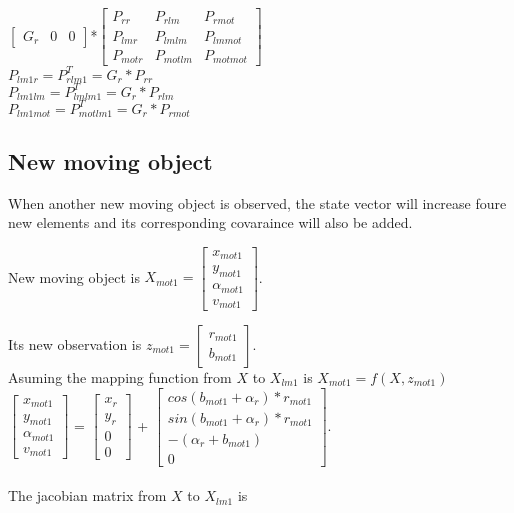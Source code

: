 \documentclass[11pt,a4paper]{article}
\begin{document}
										    $  \begin{bmatrix} G_{r} & 0 & 0 \end{bmatrix}$*$\begin{bmatrix} P_{rr} & P_{rlm} & P_{rmot}\\
										   P_{lmr}& P_{lmlm}  & P_{lmmot}\\
										   P_{motr}& P_{motlm}  & P_{motmot}\end{bmatrix}$\\
\noindent $P_{lm1r} = P_{rlm1}^{T} = G_{r}*P_{rr}$
\\										   									   
\noindent $P_{lm1lm} = P_{lmlm1}^{T} = G_{r}*P_{rlm}$
\\
\noindent $P_{lm1mot} = P_{motlm1}^{T} = G_{r}*P_{rmot}$

\subsection{New moving object}
When another new moving object is observed, the state vector will increase foure new elements and its corresponding covaraince will also be added.

\noindent New moving object is $ X_{mot1} =  \begin{bmatrix} x_{mot1} \\ y_{mot1} \\ \alpha_{mot1} \\ v_{mot1} \end{bmatrix} $.

\noindent Its new observation is $z_{mot1} = \begin{bmatrix} r_{mot1} \\ b_{mot1} \end{bmatrix}$.
\\
Asuming the mapping function from $X$ to $X_{lm1}$ is $X_{mot1} = f(X,z_{mot1})$
\\
\noindent $\begin{bmatrix} x_{mot1} \\ y_{mot1} \\ \alpha_{mot1} \\ v_{mot1} \end{bmatrix}$ = $\begin{bmatrix} x_{r} \\ y_{r} \\ 0 \\ 0 \end{bmatrix}$  +  $\begin{bmatrix}  cos(b_{mot1}+\alpha_{r})*r_{mot1}\\ sin(b_{mot1}+\alpha_{r})*r_{mot1}  \\ -(\alpha_{r}+b_{mot1}) \\ 0 \end{bmatrix}$.
\\
\\
\noindent The jacobian matrix from $X$ to $X_{lm1}$ is 
\end{document}
